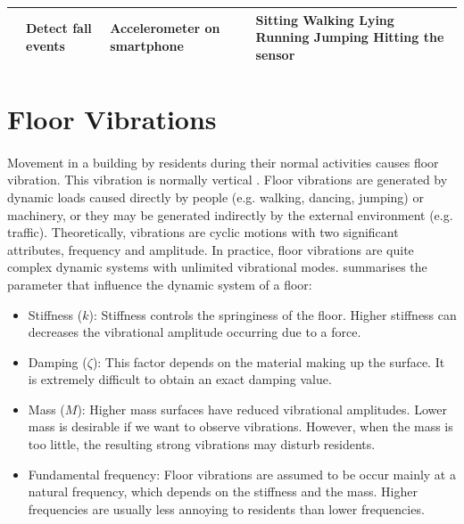 \begin{table}[H]
\begin{center}
\begin{tabular}{m{} m{} m{} m{} }
\cite{abbate_avvenuti_bonatesta_cola_corsini_vecchio_2012} \raggedright & Detect fall events & Accelerometer on smartphone & Sitting \newline Walking \newline Lying \newline Running \newline Jumping \newline Hitting the sensor \\
\hline

   \end{tabular}
\end{center}
\end{table}


\section{Floor Vibrations}
\paragraph{}
Movement in a building by residents during their normal activities causes floor vibration. This vibration is normally vertical \cite{steelconstruction_2016}. Floor vibrations are generated by dynamic loads caused directly by people (e.g. walking, dancing, jumping) or machinery, or they may be generated indirectly by the external environment (e.g. traffic). Theoretically, vibrations are cyclic motions with two significant attributes, frequency and amplitude. In practice, floor vibrations are quite complex dynamic systems with unlimited vibrational modes. \citeauthor{ljunggren2006floor} \citeyear{ljunggren2006floor} summarises the parameter that influence the dynamic system of a floor:
\begin{itemize}
\item Stiffness ($k$): Stiffness controls the springiness of the floor. Higher stiffness can decreases the vibrational amplitude occurring due to a force.
\item Damping ($\zeta$): This factor depends on the material making up the surface. It is extremely difficult to obtain an exact damping value.
\item Mass ($M$): Higher mass surfaces have reduced vibrational amplitudes. Lower mass is desirable if we want to observe vibrations. However, when the mass is too little, the resulting strong vibrations may disturb residents.
\item Fundamental frequency: Floor vibrations are assumed to be occur mainly at a natural frequency, which depends on the stiffness and the mass. Higher frequencies are usually less annoying to residents than lower frequencies.\paragraph{}
\end{itemize}
